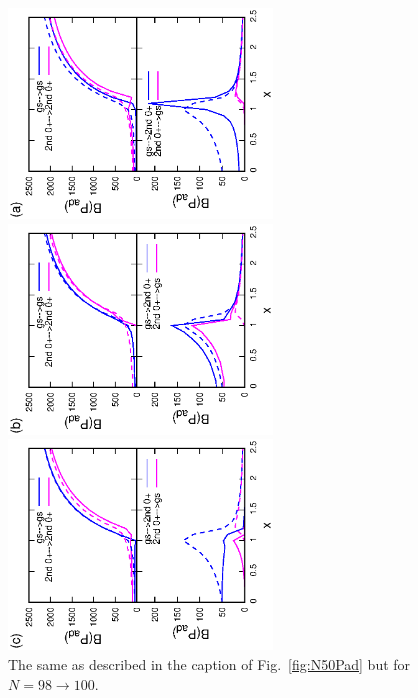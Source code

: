 \documentclass[11pt]{book} %
\begin{document}
\begin{figure}[t]
 \begin{minipage}{0.3\hsize}
 \begin{center}
  \includegraphics[width=70mm,angle=-90]{images/N100Pad_CQ.eps}
 \end{center}
 \captionsetup{labelformat=empty,labelsep=none}
 \end{minipage}
 \begin{minipage}{0.3\hsize}
 \begin{center}
  \includegraphics[width=70mm,angle=-90]{images/N100Pad_FD.eps}
 \end{center}
 \captionsetup{labelformat=empty,labelsep=none}
 \end{minipage}
 \begin{minipage}{0.3\hsize}
 \begin{center}
  \includegraphics[width=70mm,angle=-90]{images/N100Pad_SPA.eps}
 \end{center}
 \captionsetup{labelformat=empty,labelsep=none}
 \end{minipage}
 \caption{
The same as described in the caption of Fig.~\ref{fig:N50Pad} but for $N=98\rightarrow 100$.}
 \label{fig:N100Pad}
\end{figure}
\end{document}
